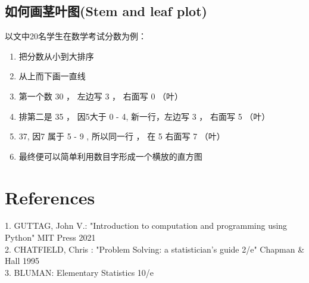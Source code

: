 \hypertarget{ux5982ux4f55ux753bux830eux53f6ux56festem-and-leaf-plot}{%
\subsection{如何画茎叶图(Stem and leaf
plot)}\label{ux5982ux4f55ux753bux830eux53f6ux56festem-and-leaf-plot}}

以文中20名学生在数学考试分数为例：

\begin{enumerate}
\tightlist
\item
  把分数从小到大排序
\item
  从上而下画一直线
\item
  第一个数 30 ， 左边写 3 ， 右面写 0 （叶）
\item
  排第二是 35 ， 因5大于 0 - 4, 新一行，左边写 3 ， 右面写 5 （叶）
\item
  37, 因7 属于 5 - 9 , 所以同一行 ， 在 5 右面写 7 （叶）
\item
  最终便可以简单利用数目字形成一个横放的直方图
\end{enumerate}

\hypertarget{references}{%
\section{References}\label{references}}

1. GUTTAG, John V.: "Introduction to computation and programming using
Python" MIT Press 2021\\
2. CHATFIELD, Chris : "Problem Solving: a statistician's guide 2/e"
Chapman \& Hall 1995\\
3. BLUMAN: Elementary Statistics 10/e\\






